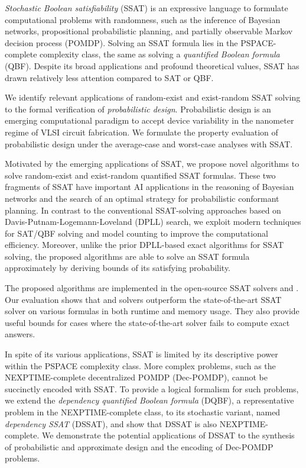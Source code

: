 \textit{Stochastic Boolean satisfiability} (SSAT) is an expressive language to formulate computational problems with randomness,
such as the inference of Bayesian networks,
propositional probabilistic planning,
and partially observable Markov decision process (POMDP).
Solving an SSAT formula lies in the PSPACE-complete complexity class,
the same as solving a \textit{quantified Boolean formula} (QBF).
Despite its broad applications and profound theoretical values,
SSAT has drawn relatively less attention compared to SAT or QBF.

We identify relevant applications of random-exist and exist-random SSAT solving to the formal verification of \textit{probabilistic design}.
Probabilistic design is an emerging computational paradigm to accept device variability in the nanometer regime of VLSI circuit fabrication.
We formulate the property evaluation of probabilistic design under the average-case and worst-case analyses with SSAT.

Motivated by the emerging applications of SSAT,
we propose novel algorithms to solve random-exist and exist-random quantified SSAT formulas.
These two fragments of SSAT have important AI applications in the reasoning of Bayesian networks and the search of an optimal strategy for probabilistic conformant planning.
In contrast to the conventional SSAT-solving approaches based on Davis-Putnam-Logemann-Loveland (DPLL) search,
we exploit modern techniques for SAT/QBF solving and model counting to improve the computational efficiency.
Moreover, unlike the prior DPLL-based exact algorithms for SSAT solving,
the proposed algorithms are able to solve an SSAT formula approximately by deriving bounds of its satisfying probability.

The proposed algorithms are implemented in the open-source SSAT solvers \ressat and \erssat.
Our evaluation shows that \ressat and \erssat solvers outperform the state-of-the-art SSAT solver on various formulas in both runtime and memory usage.
They also provide useful bounds for cases where the state-of-the-art solver fails to compute exact answers.

In spite of its various applications,
SSAT is limited by its descriptive power within the PSPACE complexity class.
More complex problems, such as the NEXPTIME-complete decentralized POMDP (Dec-POMDP), cannot be succinctly encoded with SSAT.
To provide a logical formalism for such problems,
we extend the \textit{dependency quantified Boolean formula} (DQBF),
a representative problem in the NEXPTIME-complete class,
to its stochastic variant, named \textit{dependency SSAT} (DSSAT),
and show that DSSAT is also NEXPTIME-complete.
We demonstrate the potential applications of DSSAT to the synthesis of probabilistic and approximate design and the encoding of Dec-POMDP problems.

